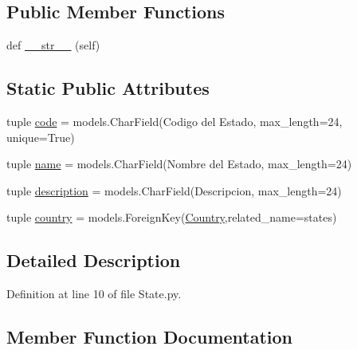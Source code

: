 \subsection*{Public Member Functions}
\begin{DoxyCompactItemize}
\item 
def \hyperlink{class_ground_segment_1_1models_1_1_state_1_1_state_a79a6e0c8e9600f2bc1bdf7613745399b}{\+\_\+\+\_\+str\+\_\+\+\_\+} (self)
\end{DoxyCompactItemize}
\subsection*{Static Public Attributes}
\begin{DoxyCompactItemize}
\item 
tuple \hyperlink{class_ground_segment_1_1models_1_1_state_1_1_state_a6a768e82c386021b965ac4b6f25006f0}{code} = models.\+Char\+Field(\textquotesingle{}Codigo del Estado\textquotesingle{}, max\+\_\+length=24, unique=True)
\item 
tuple \hyperlink{class_ground_segment_1_1models_1_1_state_1_1_state_a86dbd0b52a7eb954d59b33f4a29fb718}{name} = models.\+Char\+Field(\textquotesingle{}Nombre del Estado\textquotesingle{}, max\+\_\+length=24)
\item 
tuple \hyperlink{class_ground_segment_1_1models_1_1_state_1_1_state_a95d135c5695095cfbd949dd4076556e7}{description} = models.\+Char\+Field(\textquotesingle{}Descripcion\textquotesingle{}, max\+\_\+length=24)
\item 
tuple \hyperlink{class_ground_segment_1_1models_1_1_state_1_1_state_ab93fe4bbc192f2a1a26a25643671c373}{country} = models.\+Foreign\+Key(\hyperlink{class_ground_segment_1_1models_1_1_country_1_1_country}{Country},related\+\_\+name=\textquotesingle{}states\textquotesingle{})
\end{DoxyCompactItemize}


\subsection{Detailed Description}


Definition at line 10 of file State.\+py.



\subsection{Member Function Documentation}
\hypertarget{class_ground_segment_1_1models_1_1_state_1_1_state_a79a6e0c8e9600f2bc1bdf7613745399b}{}
